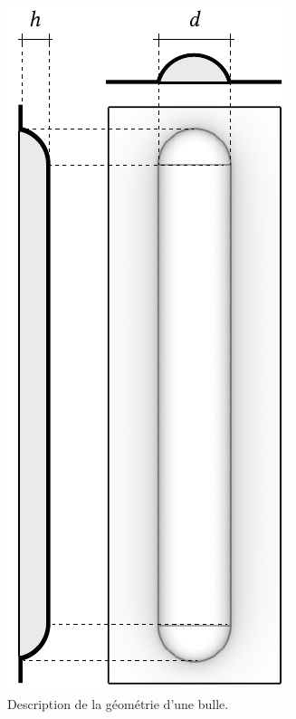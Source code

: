 \documentclass[11pt,titlepage]{article}
\begin{document}
\begin{figure}
    \centering
    \includegraphics[width=0.8\linewidth]{img/bulle/geo_bulles1.pdf}
    \caption{Description de la géométrie d'une bulle.}
    \label{fig:geo_bulle1}
    \vspace{-10pt}
    \end{figure}
\end{document}
